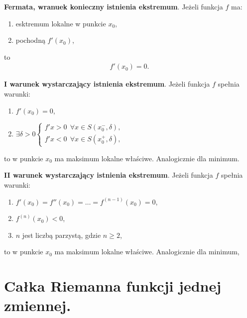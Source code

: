 \documentclass[12pt]{article}
\begin{document}
    \begin{theorem}
        \textbf{Fermata, wranuek konieczny istnienia ekstremum}. Jeżeli funkcja $f$ ma:
        \begin{enumerate}
            \item esktremum lokalne w punkcie $x_0$,
            \item pochodną $f'(x_0)$,
        \end{enumerate}
        to
        \begin{align*}
            f'(x_0) = 0.
        \end{align*}
    \end{theorem}

    \begin{theorem}
        \textbf{I warunek wystarczający istnienia ekstremum}. Jeżeli funkcja $f$ spełnia warunki:
        \begin{enumerate}
            \item $f'(x_0) = 0$,
            \item $\exists \delta > 0
            \left\{\begin{matrix}
                       f'{x} > 0 ~~ \forall x \in  S(x^{-}_0, \delta), \\
                       f'{x} < 0 ~~ \forall x \in  S(x^{+}_0, \delta),
            \end{matrix}\right.$
        \end{enumerate}
        to w punkcie $x_0$ ma maksimum lokalne właściwe. Analogicznie dla minimum.
    \end{theorem}

    \begin{theorem}
        \textbf{II warunek wystarczający istnienia ekstremum}. Jeżeli funkcja $f$ spełnia warunki:
        \begin{enumerate}
            \item $f'(x_0) = f''(x_0) = \dots = f^{(n-1)}(x_0) = 0$,
            \item $f^{(n)}(x_0) < 0$,
            \item $n$ jest liczbą parzystą, gdzie $n \geq 2$,
        \end{enumerate}
        to w punkcie $x_0$ ma maksimum lokalne właściwe. Analogicznie dla minimum,
    \end{theorem}

    \newpage

    \section{Całka Riemanna funkcji jednej zmiennej.}
\end{document}
